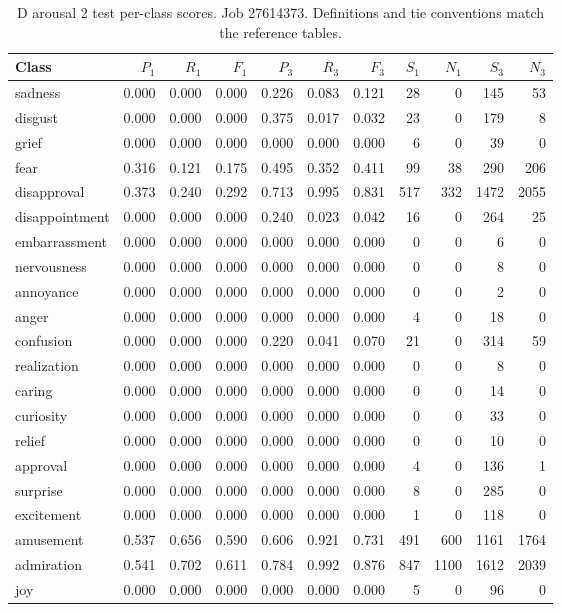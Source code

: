\begin{table}[!htbp]
\centering
\scriptsize
\setlength{\tabcolsep}{5pt}
\begin{tabular}{lrrrrrrrrrr}
\toprule
Class & $P_1$ & $R_1$ & $F_1$ & $P_3$ & $R_3$ & $F_3$ & $S_1$ & $N_1$ & $S_3$ & $N_3$ \\
\midrule
sadness & 0.000 & 0.000 & 0.000 & 0.226 & 0.083 & 0.121 & 28 & 0 & 145 & 53 \\
disgust & 0.000 & 0.000 & 0.000 & 0.375 & 0.017 & 0.032 & 23 & 0 & 179 & 8 \\
grief & 0.000 & 0.000 & 0.000 & 0.000 & 0.000 & 0.000 & 6 & 0 & 39 & 0 \\
fear & 0.316 & 0.121 & 0.175 & 0.495 & 0.352 & 0.411 & 99 & 38 & 290 & 206 \\
disapproval & 0.373 & 0.240 & 0.292 & 0.713 & 0.995 & 0.831 & 517 & 332 & 1472 & 2055 \\
disappointment & 0.000 & 0.000 & 0.000 & 0.240 & 0.023 & 0.042 & 16 & 0 & 264 & 25 \\
embarrassment & 0.000 & 0.000 & 0.000 & 0.000 & 0.000 & 0.000 & 0 & 0 & 6 & 0 \\
nervousness & 0.000 & 0.000 & 0.000 & 0.000 & 0.000 & 0.000 & 0 & 0 & 8 & 0 \\
annoyance & 0.000 & 0.000 & 0.000 & 0.000 & 0.000 & 0.000 & 0 & 0 & 2 & 0 \\
anger & 0.000 & 0.000 & 0.000 & 0.000 & 0.000 & 0.000 & 4 & 0 & 18 & 0 \\
confusion & 0.000 & 0.000 & 0.000 & 0.220 & 0.041 & 0.070 & 21 & 0 & 314 & 59 \\
realization & 0.000 & 0.000 & 0.000 & 0.000 & 0.000 & 0.000 & 0 & 0 & 8 & 0 \\
caring & 0.000 & 0.000 & 0.000 & 0.000 & 0.000 & 0.000 & 0 & 0 & 14 & 0 \\
curiosity & 0.000 & 0.000 & 0.000 & 0.000 & 0.000 & 0.000 & 0 & 0 & 33 & 0 \\
relief & 0.000 & 0.000 & 0.000 & 0.000 & 0.000 & 0.000 & 0 & 0 & 10 & 0 \\
approval & 0.000 & 0.000 & 0.000 & 0.000 & 0.000 & 0.000 & 4 & 0 & 136 & 1 \\
surprise & 0.000 & 0.000 & 0.000 & 0.000 & 0.000 & 0.000 & 8 & 0 & 285 & 0 \\
excitement & 0.000 & 0.000 & 0.000 & 0.000 & 0.000 & 0.000 & 1 & 0 & 118 & 0 \\
amusement & 0.537 & 0.656 & 0.590 & 0.606 & 0.921 & 0.731 & 491 & 600 & 1161 & 1764 \\
admiration & 0.541 & 0.702 & 0.611 & 0.784 & 0.992 & 0.876 & 847 & 1100 & 1612 & 2039 \\
joy & 0.000 & 0.000 & 0.000 & 0.000 & 0.000 & 0.000 & 5 & 0 & 96 & 0 \\
\bottomrule
\end{tabular}
\caption{D arousal 2 test per-class scores. Job 27614373. Definitions and tie conventions match the reference tables.}
\label{tab:classes-d_arousal_k2}
\end{table}
